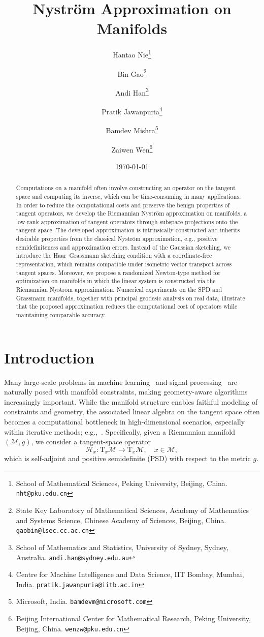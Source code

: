 \documentclass[final,onefignum,onetabnum]{siamart250211}
\title{Nystr\"om Approximation on Manifolds}
\author{
Hantao Nie\thanks{School of Mathematical Sciences, Peking University, Beijing, China. \texttt{nht@pku.edu.cn}} 
\and Bin Gao\thanks{State Key Laboratory of Mathematical Sciences, Academy of Mathematics and Systems Science, Chinese Academy of Sciences, Beijing, China. \texttt{gaobin@lsec.cc.ac.cn}}
\and Andi Han\thanks{School of Mathematics and Statistics, University of Sydney, Sydney, Australia. \texttt{andi.han@sydney.edu.au}}
\and Pratik Jawanpuria\thanks{Centre for Machine Intelligence and Data Science, IIT Bombay, Mumbai, India. \texttt{pratik.jawanpuria@iitb.ac.in}}
\and Bamdev Mishra\thanks{Microsoft, India. \texttt{bamdevm@microsoft.com}}
\and Zaiwen Wen\thanks{Beijing International Center for Mathematical Research, Peking University, Beijing, China. \texttt{wenzw@pku.edu.cn}}
}
\date{\today}
\begin{document}
\maketitle
\raggedbottom

\begin{abstract}
    Computations on a manifold often involve constructing an operator on the tangent space and computing its inverse, which can be time-consuming in many applications. In order to reduce the computational costs and preserve the benign properties of tangent operators, we develop the Riemannian Nystr\"om approximation on manifolds, a low-rank approximation of tangent operators through subspace projections onto the tangent space. 
    The developed approximation is intrinsically constructed and inherits desirable properties from the classical Nystr\"om approximation, e.g., positive semidefiniteness and approximation errors. Instead of the Gaussian sketching, we introduce the Haar--Grassmann sketching condition with a coordinate-free representation, which remains compatible under isometric vector transport across tangent spaces. Moreover, we propose a randomized Newton-type method for optimization on manifolds in which the linear system is constructed via the Riemannian Nystr\"om approximation. Numerical experiments on the SPD and Grassmann manifolds, together with principal geodesic analysis on real data, illustrate that the proposed approximation reduces the computational cost of operators while maintaining comparable accuracy.
  \end{abstract}

\section{Introduction}

Many large-scale problems in machine learning~\cite{bronstein2021geometric} and signal processing~\cite{zhu2018image} are naturally posed with manifold constraints, making geometry-aware algorithms increasingly important.
While the manifold structure enables faithful modeling of constraints and geometry, the associated linear algebra on the tangent space often becomes a computational bottleneck in high-dimensional scenarios, especially within iterative methods; e.g.,~\cite{AbsilBakerGallivan2007}. Specifically, given a Riemannian manifold $(\mathcal{M},g)$, we consider a tangent-space operator
\[
\mathcal{H}_x : \mathrm{T}_x\mathcal M \to \mathrm{T}_x\mathcal M, \quad x \in \mathcal{M},
\]
which is self-adjoint and positive semidefinite (PSD) with respect to the metric $g$.
\end{document}
